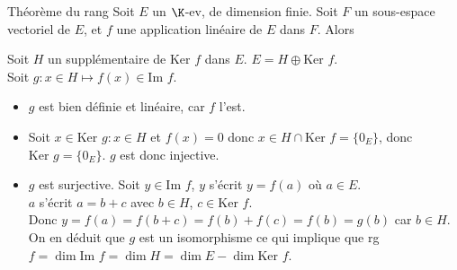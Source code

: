 \documentclass[12pt, a4paper]{report}
\begin{document}
\begin{theoreme}{Théorème du rang}{}
	Soit $E$ un $\K$-ev, de dimension finie. Soit $F$ un sous-espace vectoriel de $E$, et $f$ une application linéaire de $E$ dans $F$.  Alors
	\begin{center}
	\end{center}
\end{theoreme}

\begin{demo}{}
Soit $H$ un supplémentaire de $\text{Ker } f$ dans $E$. $E = H \oplus \text{Ker } f$. \\
Soit $g : x \in H \mapsto f(x) \in \text{Im } f$. 

\begin{itemize}
	\item $g$ est bien définie et linéaire, car $f$ l'est.
	\item Soit $x \in \text{Ker }g : x \in H$ et $f(x) = 0$ donc $x \in H \cap \text{Ker }f = \{0_E\}$, donc $\text{Ker }g = \{0_E\}$. $g$ est donc injective. \\
	\item $g$ est surjective. Soit $y \in \text{Im }f$, $y$ s'écrit $y = f(a)$ où $a \in E$. \\
	$a$ s'écrit $a=b+c$ avec $b \in H$, $c \in \text{Ker }f$. \\
	Donc $y = f(a) = f(b+c) = f(b)+f(c) =f(b) = g(b)$ car $b \in H$. \\
	On en déduit que $g$ est un isomorphisme ce qui implique que rg $f = \dim \text{Im }f = \dim H = \dim E - \dim \text{Ker }f$. \\
\end{itemize}
\end{demo}
\end{document}
